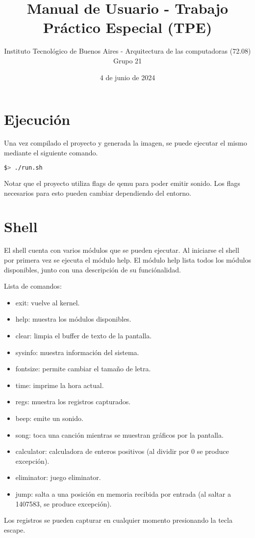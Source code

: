 \documentclass{article}
\title{\textbf{Manual de Usuario - Trabajo Práctico Especial (TPE)}}
\author{ \large Instituto Tecnológico de Buenos Aires - Arquitectura de las computadoras (72.08) \\ [1ex]
\large Grupo 21}
\date{4 de junio de 2024}
\begin{document}
\maketitle

\section *{Ejecución}

Una vez compilado el proyecto y generada la imagen, se puede ejecutar el mismo mediante el siguiente comando.

\begin{lstlisting}[language=bash]
$> ./run.sh
\end{lstlisting}

Notar que el proyecto utiliza flags de qemu para poder emitir sonido. Los flags necesarios para esto pueden cambiar dependiendo del entorno.

\section *{Shell}

El shell cuenta con varios módulos que se pueden ejecutar. Al iniciarse el shell por primera vez se ejecuta el módulo help. El módulo help lista todos los módulos disponibles, junto con una descripción de su funciónalidad.

Lista de comandos:
\begin{itemize}
\item exit: vuelve al kernel.
\item help: muestra los módulos disponibles.
\item clear: limpia el buffer de texto de la pantalla.
\item sysinfo: muestra información del sistema.
\item fontsize: permite cambiar el tamaño de letra.
\item time: imprime la hora actual.
\item regs: muestra los registros capturados.
\item beep: emite un sonido.
\item song: toca una canción mientras se muestran gráficos por la pantalla.
\item calculator: calculadora de enteros positivos (al dividir por 0 se produce excepción).
\item eliminator: juego eliminator.
\item jump: salta a una posición en memoria recibida por entrada (al saltar a 1407583, se produce excepción).
\end{itemize}
Los registros se pueden capturar en cualquier momento presionando la tecla escape.
\end{document}
